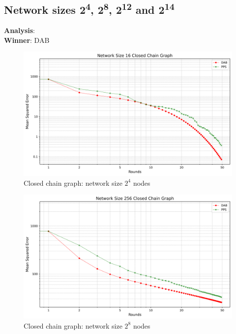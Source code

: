 \subsection{Network sizes 2\textsuperscript{4}, 2\textsuperscript{8}, 2\textsuperscript{12} and 2\textsuperscript{14}}
\textbf{Analysis}:  \\
\textbf{Winner}: DAB\\
\begin{figure}[H]
    \centering
    \includegraphics[scale=0.5]{figures/closedChainSimulations/DAB_vs_PPS_CCG_r50_n16.png}
    \caption{Closed chain graph: network size $2^{4}$ nodes}
    \label{fig:16ChainGraph}
\end{figure}

\begin{figure}[H]
    \centering
    \includegraphics[scale=0.5]{figures/closedChainSimulations/DAB_vs_PPS_CCG_r50_n256.png}
    \caption{Closed chain graph: network size $2^{8}$ nodes}
    \label{fig:256ChainGraph}
\end{figure}

